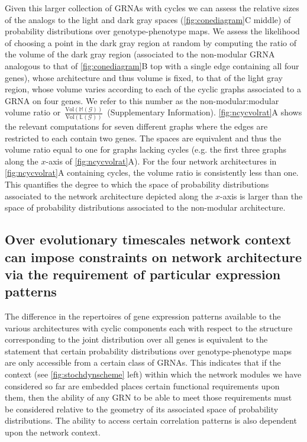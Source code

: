 Given this larger collection of GRNAs with cycles we can assess the relative sizes of the analogs to the light and dark gray spaces (\ref{fig:conediagram}C middle) of probability distributions over genotype-phenotype maps. We assess the likelihood of choosing a point in the dark gray region at random by computing the ratio of the volume of the dark gray region (associated to the non-modular GRNA analogous to that of \ref{fig:conediagram}B top with a single edge containing all four genes), whose architecture and thus volume is fixed, to that of the light gray region, whose volume varies according to each of the cyclic graphs associated to a GRNA on four genes. We refer to this number as the non-modular:modular volume ratio or~$\frac{\text{Vol}(\mathbb{M}(\mathcal{G}))}{\text{Vol}(\mathbb{L}(\mathcal{G}))}$~(Supplementary Information). \ref{fig:ncycvolrat}A shows the relevant computations for seven different graphs where the edges are restricted to each contain two genes. The spaces are equivalent and thus the volume ratio equal to one for graphs lacking cycles (e.g. the first three graphs along the $x$-axis of \ref{fig:ncycvolrat}A). For the four network architectures in \ref{fig:ncycvolrat}A containing cycles, the volume ratio is consistently less than one. This quantifies the degree to which the space of probability distributions associated to the network architecture depicted along the $x$-axis is larger than the space of probability distributions associated to the non-modular architecture.

\subsection{Over evolutionary timescales network context can impose constraints on network architecture via the requirement of particular expression patterns}

The difference in the repertoires of gene expression patterns available to the various architectures with cyclic components each with respect to the structure corresponding to the joint distribution over all genes is equivalent to the statement that certain probability distributions over genotype-phenotype maps are only accessible from a certain class of GRNAs. This indicates that if the context (see \ref{fig:stochdynscheme} left) within which the network modules we have considered so far are embedded places certain functional requirements upon them, then the ability of any GRN to be able to meet those requirements must be considered relative to the geometry of its associated space of probability distributions. The ability to access certain correlation patterns is also dependent upon the network context.

